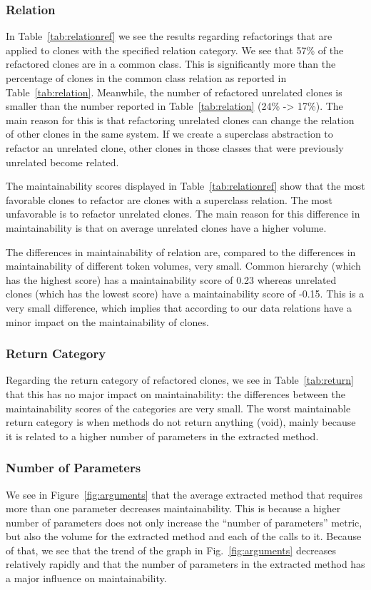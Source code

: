 \subsubsection{Relation}
In Table~\ref{tab:relationref} we see the results regarding refactorings that are applied to clones with the specified relation category. We see that 57\% of the refactored clones are in a common class. This is significantly more than the percentage of clones in the common class relation as reported in Table~\ref{tab:relation}. Meanwhile, the number of refactored unrelated clones is smaller than the number reported in Table~\ref{tab:relation} (24\% -> 17\%). The main reason for this is that refactoring unrelated clones can change the relation of other clones in the same system. If we create a superclass abstraction to refactor an unrelated clone, other clones in those classes that were previously unrelated become related.

The maintainability scores displayed in Table~\ref{tab:relationref} show that the most favorable clones to refactor are clones with a superclass relation. The most unfavorable is to refactor unrelated clones. The main reason for this difference in maintainability is that on average unrelated clones have a higher volume.

The differences in maintainability of relation are, compared to the differences in maintainability of different token volumes, very small. Common hierarchy (which has the highest score) has a maintainability score of 0.23 whereas unrelated clones (which has the lowest score) have a maintainability score of -0.15. This is a very small difference, which implies that according to our data relations have a minor impact on the maintainability of clones.

\subsubsection{Return Category}
Regarding the return category of refactored clones, we see in Table~\ref{tab:return} that this has no major impact on maintainability: the differences between the maintainability scores of the categories are very small. The worst maintainable return category is when methods do not return anything (void), mainly because it is related to a higher number of parameters in the extracted method.

\subsubsection{Number of Parameters}
We see in Figure~\ref{fig:arguments} that the average extracted method that requires more than one parameter decreases maintainability. This is because a higher number of parameters does not only increase the ``number of parameters'' metric, but also the volume for the extracted method and each of the calls to it. Because of that, we see that the trend of the graph in Fig.~\ref{fig:arguments} decreases relatively rapidly and that the number of parameters in the extracted method has a major influence on maintainability.
